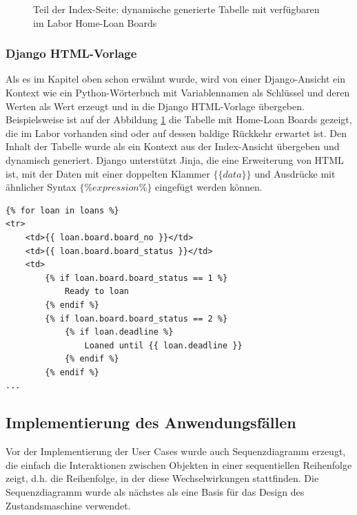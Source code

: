 \begin{figure}[hb!]
	\centering
	\caption{Teil der Index-Seite: dynamische generierte Tabelle mit verfügbaren im Labor Home-Loan Boards}
	\label{fig:loaned}
\end{figure}

\subsubsection{Django HTML-Vorlage}
\label{sec:server:design:templates}
Als es im Kapitel oben schon erwähnt wurde, wird von einer Django-Ansicht ein Kontext wie ein Python-Wörterbuch mit Variablennamen als Schlüssel und deren Werten als Wert erzeugt und in die Django HTML-Vorlage übergeben. Beispielsweise ist auf der Abbildung \ref{fig:loaned} die Tabelle mit Home-Loan Boards gezeigt, die im Labor vorhanden sind oder auf dessen baldige Rückkehr erwartet ist. Den Inhalt der Tabelle wurde als ein Kontext aus der Index-Ansicht übergeben und dynamisch generiert. Django unterstützt Jinja, die eine Erweiterung von HTML ist, mit der Daten mit einer doppelten Klammer $\{\{data\}\}$ und Ausdrücke mit ähnlicher Syntax $\{\% expression\%\}$ eingefügt werden können.

\begin{lstlisting}[caption={Django Template Sprache in index.html},captionpos=b]
{% for loan in loans %}
<tr>
	<td>{{ loan.board.board_no }}</td>
	<td>{{ loan.board.board_status }}</td>
	<td>
		{% if loan.board.board_status == 1 %}
			Ready to loan
		{% endif %}
		{% if loan.board.board_status == 2 %}
			{% if loan.deadline %}
				Loaned until {{ loan.deadline }}
			{% endif %}
		{% endif %}
...
\end{lstlisting}

\subsection{Implementierung des Anwendungsfällen}
\label{sec:server:fsm}
Vor der Implementierung der User Cases wurde auch Sequenzdiagramm erzeugt, die einfach die Interaktionen zwischen Objekten in einer sequentiellen Reihenfolge zeigt, d.h. die Reihenfolge, in der diese Wechselwirkungen stattfinden. Die Sequenzdiagramm wurde als nächstes als eine Basis für das Design des Zustandsmaschine verwendet.  

